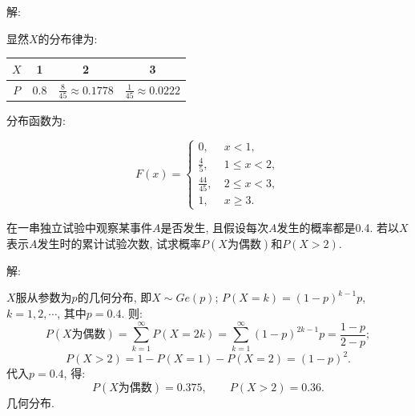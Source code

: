 \documentclass[standard]{ExBook}
\begin{document}
\begin{qitems}
\vspace{-5em}

    \begin{bbox}
解: 

显然$X$的分布律为:
\begin{center}
\setlength{\tabcolsep}{30pt}
\begin{tabular}{c|c|c|c}
    \hline
    $X$ & 1 & 2 & 3 \\
    \hline
    $P$ & 0.8 & $\frac{8}{45}\approx0.1778$ & $\frac{1}{45}\approx0.0222$\\
    \hline
\end{tabular}
\end{center}
分布函数为:
\vspace{-2em}
\begin{center}
\begin{equation}
    F(x)=
    \left\{
    \begin{array}{cl}
        \nonumber
        0,\ &x < 1,\\
        \frac{4}{5},\ &1 \leq x < 2,\\
        \frac{44}{45},\ &2 \leq x < 3,\\
        1,\ &x \geq 3.
    \end{array}
    \right.
\end{equation}
\end{center}
    \end{bbox}

\vspace{-5em}

    \begin{bbox}
    \begin{shaded}
        \qitem
在一串独立试验中观察某事件$A$是否发生, 且假设每次$A$发生的概率都是0.4. 若以$X$表示$A$发生时的累计试验次数, 试求概率$P(X\text{为偶数})$和$P(X > 2)$.
    \end{shaded}
    \end{bbox}

\vspace{-5em}

    \begin{bbox}
解: 

$X$服从参数为$p$的几何分布, 即$X\sim Ge(p)$; $P(X=k)=(1-p)^{k-1}p$, $k=1,2,\cdots$, 其中$p=0.4$. 则:
$$P(X\text{为偶数})=\sum\limits_{k=1}^{\infty}P(X=2k)=\sum\limits_{k=1}^{\infty}(1-p)^{2k-1}p=\frac{1-p}{2-p};$$
$$P(X > 2)=1-P(X=1)-P(X=2)=(1-p)^2.$$
代入$p=0.4$, 得:
$$P(X\text{为偶数})=0.375,\qquad P(X > 2)=0.36.$$
\textcolor{themeColor}{\selectfont {} 几何分布.}
    \end{bbox}


\end{qitems}
\end{document}
